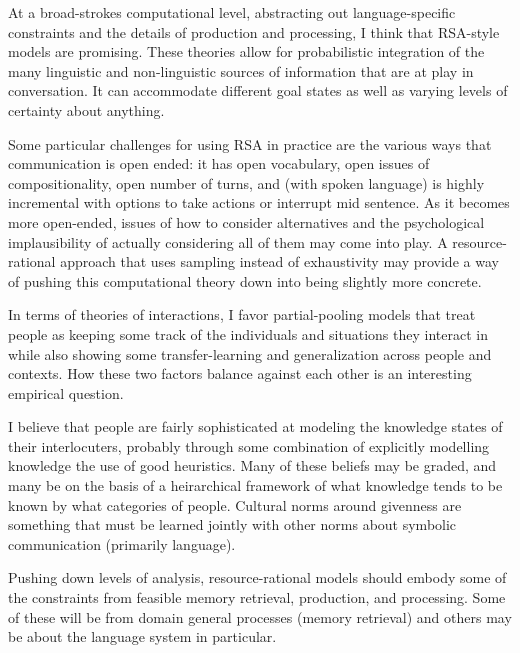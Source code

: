 \documentclass[]{article}
\begin{document}
At a broad-strokes computational level, abstracting out language-specific constraints and the details of production and processing, I think that RSA-style models are promising. These theories allow for probabilistic integration of the many linguistic and non-linguistic sources of information that are at play in conversation. It can accommodate different goal states as well as varying levels of certainty about anything.


Some particular challenges for using RSA in practice are the various ways that communication is open ended: it has open vocabulary, open issues of compositionality, open number of turns, and (with spoken language) is highly incremental with options to take actions or interrupt mid sentence. As it becomes more open-ended, issues of how to consider alternatives and the psychological implausibility of actually considering all of them may come into play. A resource-rational approach that uses sampling instead of exhaustivity may provide a way of pushing this computational theory down into being slightly more concrete. 

In terms of theories of interactions, I favor partial-pooling models that treat people as keeping some track of the individuals and situations they interact in while also showing some transfer-learning and generalization across people and contexts. How these two factors balance against each other is an interesting empirical question. 

I believe that people are fairly sophisticated at modeling the knowledge states of their interlocuters, probably through some combination of explicitly modelling knowledge the use of good heuristics. Many of these beliefs may be graded, and many be on the basis of a heirarchical framework of what knowledge tends to be known by what categories of people.  Cultural norms around givenness are something that must be learned jointly with other norms about symbolic communication (primarily language). 

Pushing down levels of analysis, resource-rational models should embody some of the constraints from feasible memory retrieval, production, and processing. Some of these will be from domain general processes (memory retrieval) and others may be about the language system in particular. 
\end{document}
